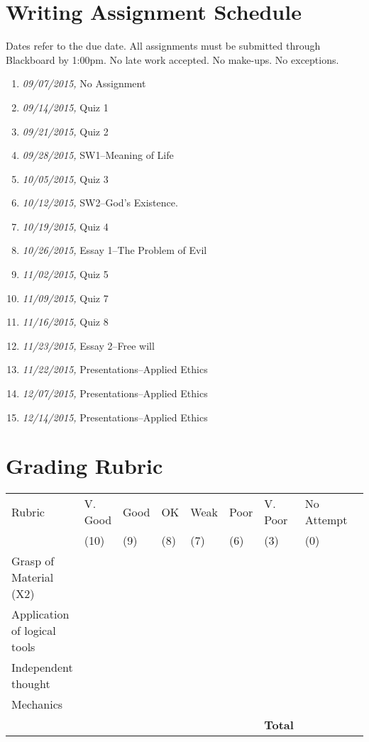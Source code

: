 \documentclass[11pt,article,oneside]{memoir}
\begin{document}
\section{Writing Assignment Schedule}
Dates refer to the due date. All assignments must be submitted through Blackboard by 1:00pm. No late work accepted. No make-ups. No exceptions. 

\begin{enumerate}
\item \textit{09/07/2015,} No Assignment
\item \textit{09/14/2015,} Quiz 1 
\item \textit{09/21/2015,} Quiz 2
\item \textit{09/28/2015,} SW1--Meaning of Life 
\item \textit{10/05/2015,} Quiz 3
\item \textit{10/12/2015,} SW2--God's Existence.
\item \textit{10/19/2015,} Quiz 4
\item \textit{10/26/2015,} Essay 1--The Problem of Evil
\item \textit{11/02/2015,} Quiz 5
\item \textit{11/09/2015,} Quiz 7 
\item \textit{11/16/2015,} Quiz 8
\item \textit{11/23/2015,} Essay 2--Free will
\item \textit{11/22/2015,} Presentations--Applied Ethics
\item \textit{12/07/2015,} Presentations--Applied Ethics
\item \textit{12/14/2015,} Presentations--Applied Ethics
\end{enumerate}

\newpage
\section{Grading Rubric}

\begin{center}


\resizebox{14cm}{!} {
    \begin{tabular}{ | l | l | l | l | l | l | l | l | l |    }
    \hline
    Rubric &  V. Good & Good & OK & Weak & Poor & V. Poor & No Attempt \\  
	 & (10) & (9) & (8) & (7) & (6) & (3)  & (0) \\    \hline
    Grasp of Material (X2) & & & & & & &\\ \hline   
    Application of logical tools &  & & & & & &\\ \hline
	Independent thought &  & & & & & &\\ \hline
 Mechanics & & & & & &  &\\ \hline \hline
 & &  & & &  & \textbf{Total}  & \\ \hline
    \end{tabular}
}


\end{center}




\end{document}
